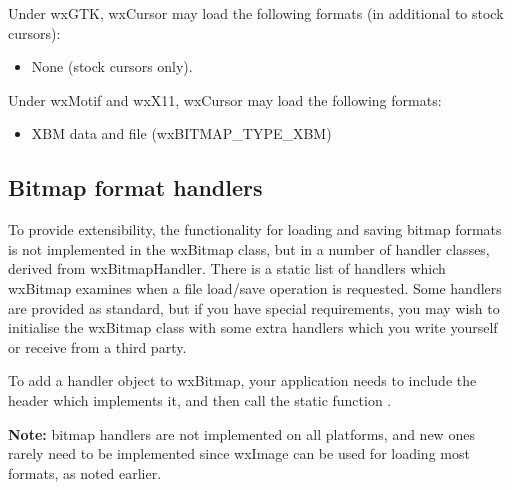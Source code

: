 Under wxGTK, wxCursor may load the following formats (in additional
to stock cursors):

\begin{itemize}\itemsep=0pt
\item None (stock cursors only).
\end{itemize}

Under wxMotif and wxX11, wxCursor may load the following formats:

\begin{itemize}\itemsep=0pt
\item XBM data and file (wxBITMAP\_TYPE\_XBM)
\end{itemize}

\subsection{Bitmap format handlers}\label{bitmaphandlers}

To provide extensibility, the functionality for loading and saving bitmap formats
is not implemented in the wxBitmap class, but in a number of handler classes,
derived from wxBitmapHandler. There is a static list of handlers which wxBitmap
examines when a file load/save operation is requested. Some handlers are provided as standard, but if you
have special requirements, you may wish to initialise the wxBitmap class with
some extra handlers which you write yourself or receive from a third party.

To add a handler object to wxBitmap, your application needs to include the header which implements it, and
then call the static function .

{\bf Note:} bitmap handlers are not implemented on all platforms, and new ones rarely need
to be implemented since wxImage can be used for loading most formats, as noted earlier.

